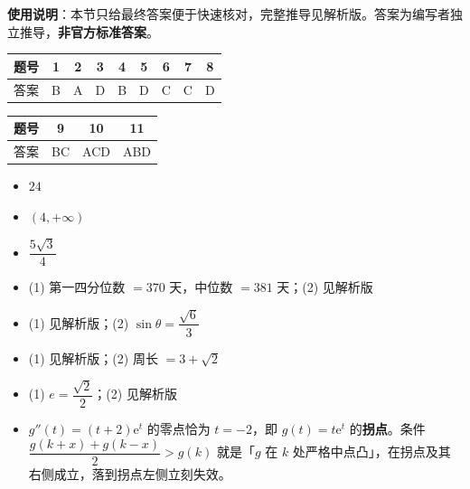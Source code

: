 
\begin{gknotice}
\textbf{使用说明}：本节只给最终答案便于快速核对，完整推导见解析版。答案为编写者独立推导，\textbf{非官方标准答案}。
\end{gknotice}

\begin{center}\begin{tabular}{ccccccccc}
\toprule
题号 & 1 & 2 & 3 & 4 & 5 & 6 & 7 & 8 \\
\midrule
答案 & B & A & D & B & D & C & C & D \\
\bottomrule
\end{tabular}\end{center}

\begin{center}\begin{tabular}{cccc}
\toprule
题号 & 9 & 10 & 11 \\
\midrule
答案 & BC & ACD & ABD \\
\bottomrule
\end{tabular}\end{center}

\begin{itemize}[leftmargin=2.6em]
  \item[\textbf{12.}] $24$
  \item[\textbf{13.}] $(4,+\infty)$
  \item[\textbf{14.}] $\dfrac{5\sqrt{3}}{4}$
\end{itemize}

\begin{itemize}[leftmargin=2.6em]
  \item[\textbf{15.}] (1) 第一四分位数 $=370$ 天，中位数 $=381$ 天；(2) 见解析版
  \item[\textbf{16.}] (1) 见解析版；(2) $\sin\theta=\dfrac{\sqrt6}{3}$
  \item[\textbf{17.}] (1) 见解析版；(2) 周长 $=3+\sqrt2$
  \item[\textbf{18.}] (1) $e=\dfrac{\sqrt2}{2}$；(2) 见解析版
  \item[\textbf{19.}] $g''(t)=(t+2)\mathrm{e}^t$ 的零点恰为 $t=-2$，即 $g(t)=t\mathrm{e}^t$ 的\textbf{拐点}。条件 $\dfrac{g(k+x)+g(k-x)}{2}>g(k)$ 就是「$g$ 在 $k$ 处严格中点凸」，在拐点及其右侧成立，落到拐点左侧立刻失效。
\end{itemize}
